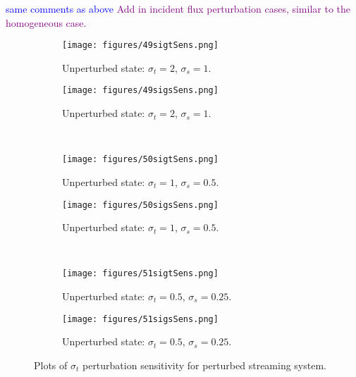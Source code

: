 \documentclass{article}
\newcommand{\sigt}{\sigma_t}
\newcommand{\sigs}{\sigma_s}
\newcommand{\comment}[2]{\marginpar{\textcolor{#2}{$\star$}}\textcolor{#2}{#1}\newline}
\newcommand{\jcr}[1]{\comment{#1}{blue}}
\newcommand{\todo}[1]{\comment{#1}{purple}}
\newcommand{\jcr}[1]{\phantom{a}}
\newcommand{\todo}[1]{\phantom{a}}
\begin{document}
\jcr{same comments as above}
\todo{Add in incident flux perturbation cases, similar to the homogeneous case.}

\begin{figure}[H]
\label{Streaming}
\centering
\begin{subfigure}{.5\textwidth}
  \centering
  \texttt{[image: figures/49sigtSens.png]}
  \caption{Unperturbed state: $\sigt=2$, $\sigs=1$.}
  \label{fig:sfig1}
\end{subfigure}%
\begin{subfigure}{.5\textwidth}
  \centering
  \texttt{[image: figures/49sigsSens.png]}
  \caption{Unperturbed state: $\sigt=2$, $\sigs=1$.}
  \label{fig:sfig4}
\end{subfigure}%
\\
\begin{subfigure}{.5\textwidth}
  \centering
  \texttt{[image: figures/50sigtSens.png]}
  \caption{Unperturbed state: $\sigt=1$, $\sigs=0.5$.}
  \label{fig:sfig2}
\end{subfigure}%
\begin{subfigure}{.5\textwidth}
  \centering
  \texttt{[image: figures/50sigsSens.png]}
  \caption{Unperturbed state: $\sigt=1$, $\sigs=0.5$.}
  \label{fig:sfig5}
\end{subfigure}%
\\
\begin{subfigure}{.5\textwidth}
  \centering
  \texttt{[image: figures/51sigtSens.png]}
  \caption{Unperturbed state: $\sigt=0.5$, $\sigs=0.25$.}
  \label{fig:sfig3}
\end{subfigure}%
\begin{subfigure}{.5\textwidth}
  \centering
  \texttt{[image: figures/51sigsSens.png]}
  \caption{Unperturbed state: $\sigt=0.5$, $\sigs=0.25$.}
  \label{fig:sfig6}
\end{subfigure}%
\caption{Plots of $\sigt$ perturbation sensitivity for perturbed streaming system.}
\label{fig:fig}
\end{figure}
\end{document}
